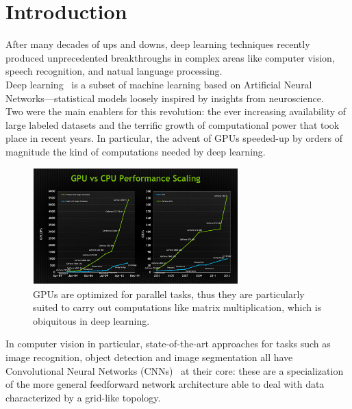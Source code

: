 \documentclass[../main.tex]{subfiles}
\begin{document}
    \chapter{Introduction}\label{chap:intro}
    \setcounter{page}{1}

    After many decades of ups and downs, deep learning techniques recently produced unprecedented breakthroughs
    in complex areas like computer vision, speech recognition, and natual language processing. \\
    Deep learning~\cite{deeplearning} is a subset of machine learning based on Artificial Neural Networks---statistical models loosely
    inspired by insights from neuroscience. \\
    Two were the main enablers for this revolution: the ever increasing availability of large labeled
    datasets and the terrific growth of computational power that took place in recent years. In particular,
    the advent of GPUs speeded-up by orders of magnitude the kind of computations needed by deep learning.

    \begin{figure}[h!]
        \centering{}
        \includegraphics[width=300px]{img/gpu-vs-cpu.png}
        \caption{GPUs are optimized for parallel tasks, thus they are particularly suited to carry out computations
        like matrix multiplication, which is obiquitous in deep learning.}\label{fig:gpu-vs-cpu}
    \end{figure}

    In computer vision in particular, state-of-the-art approaches for tasks such as image recognition,
    object detection and image segmentation all have Convolutional Neural Networks (CNNs)~\cite{lecun-89e} at their core:
	these are a specialization of the more general feedforward network architecture able to deal with data characterized by a grid-like topology.
\end{document}
